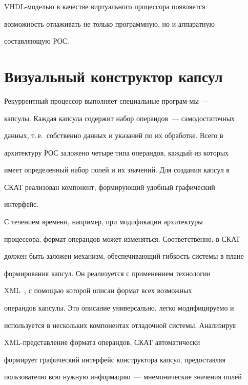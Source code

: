       VHDL-мо\-делью в качестве виртуального процессора появляется 


возможность отлаживать не только программную, но и аппаратную 


составляющую РОС.





\section{Визуальный конструктор капсул}





      Рекуррентный процессор выполняет специальные прог\-рам-\linebreak мы~--- 


капсулы. Каждая капсула содержит набор операндов~--- самодостаточных 


данных, т.\,е.\ собственно данных и указаний по их обработке. Всего в 


архитектуру РОС заложено четыре типа операндов, каждый из которых 


имеет определенный набор полей и их значений. Для создания капсул в 


СКАТ реализован компонент, формирующий удобный графический 


интерфейс. 


      


      С течением времени, например, при модификации архитектуры 


процессора, формат операндов может изменяться. Соответственно, в СКАТ 


должен быть заложен механизм, обеспечивающий гибкость системы в плане 


формирования капсул. Он реализуется с применением технологии 


XML~\cite{9-2}, с помощью которой описан формат всех возможных 


операндов капсулы. Это описание универсально, легко модифицируемо и 


используется в нескольких компонентах отладочной системы. Анализируя 


XML-пред\-став\-ле\-ние формата операндов, СКАТ автоматически 


формирует графический интерфейс конструктора капсул, предоставляя 


пользователю всю нужную информацию~--- мнемонические значения полей 



